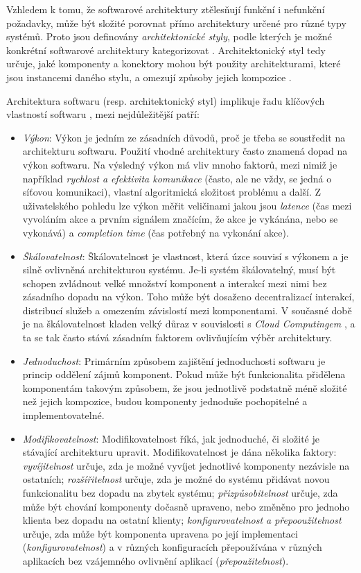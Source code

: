 Vzhledem k tomu, že softwarové architektury ztělesňují funkční i nefunkční požadavky, může být složité porovnat přímo architektury určené pro různé typy systémů. Proto jsou definovány \textit{architektonické styly}, podle kterých je možné konkrétní softwarové architektury kategorizovat \cite{Nitto99}. Architektonický styl tedy určuje, jaké komponenty a konektory mohou být použity architekturami, které jsou instancemi daného stylu, a omezují způsoby jejich kompozice \cite{Garlan95}.

Architektura softwaru (resp. architektonický styl) implikuje řadu klíčových vlastností softwaru \cite{Ghezzi03}, mezi nejdůležitější patří:
\begin{itemize}
  \item{\textit{Výkon}}: Výkon je jedním ze zásadních důvodů, proč je třeba se soustředit na architekturu softwaru. Použití vhodné architektury často znamená dopad na výkon softwaru. Na výsledný výkon má vliv mnoho faktorů, mezi nimiž je například \textit{rychlost a efektivita komunikace} (často, ale ne vždy, se jedná o síťovou komunikaci), vlastní algoritmická složitost problému a další. Z uživatelského pohledu lze výkon měřit veličinami jakou jsou \textit{latence} (čas mezi vyvoláním akce a prvním signálem značícím, že akce je vykánána, nebo se vykonává) a \textit{completion time} (čas potřebný na vykonání akce).
  \item{\textit{Škálovatelnost}}: Škálovatelnost je vlastnost, která úzce souvisí s výkonem a je silně ovlivněná architekturou systému. Je-li systém škálovatelný, musí být schopen zvládnout velké množství komponent a interakcí mezi nimi bez zásadního dopadu na výkon. Toho může být dosaženo decentralizací interakcí, distribucí služeb a omezením závislostí mezi komponentami. V současné době je na škálovatelnost kladen velký důraz v souvislosti s \textit{Cloud Computingem} \cite{Mell11}, a ta se tak často stává zásadním faktorem ovlivňujícím výběr architektury.
  \item{\textit{Jednoduchost}}: Primárním způsobem zajištění jednoduchosti softwaru je princip oddělení zájmů komponent. Pokud může být funkcionalita přidělena komponentám takovým způsobem, že jsou jednotlivě podstatně méně složité než jejich kompozice, budou komponenty jednoduše pochopitelné a implementovatelné.
  \item{\textit{Modifikovatelnost}}: Modifikovatelnost říká, jak jednoduché, či složité je stávající architekturu upravit. Modifikovatelnost je dána několika faktory: \textit{vyvíjitelnost} určuje, zda je možné vyvíjet jednotlivé komponenty nezávisle na ostatních; \textit{rozšířitelnost} určuje, zda je možné do systému přidávat novou funkcionalitu bez dopadu na zbytek systému; \textit{přizpůsobitelnost} určuje, zda může být chování komponenty dočasně upraveno, nebo změněno pro jednoho klienta bez dopadu na ostatní klienty; \textit{konfigurovatelnost a přepooužitelnost} určuje, zda může být komponenta upravena po její implementaci (\textit{konfigurovatelnost}) a v různých konfiguracích přepoužívána v různých aplikacích bez vzájemného ovlivnění aplikací (\textit{přepoužitelnost}).

\end{itemize}
